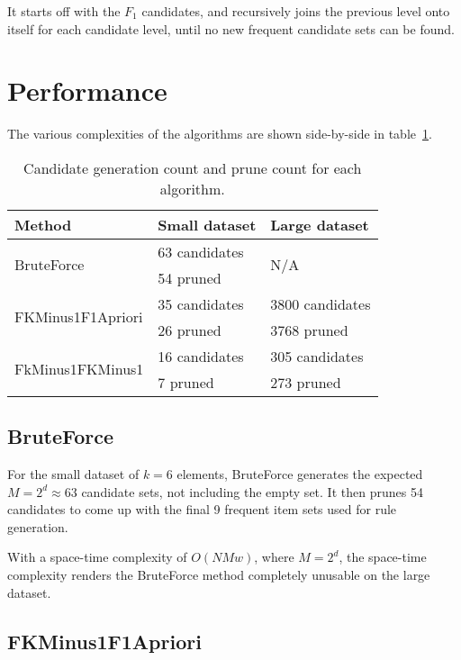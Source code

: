 \documentclass[11pt,a4paper]{article}
\begin{document}
It starts off with the $F_1$ candidates, and recursively joins the previous level onto itself for each candidate level, until no new frequent candidate sets can be found.

\section{Performance}

The various complexities of the algorithms are shown side-by-side in table~\ref{tbl:counts}.

\begin{table}
  \centering
  \begin{tabular}{|l|l|l|}
    \hline
    Method                             & Small dataset & Large dataset \\ \hline
    \multirow{2}{*}{BruteForce}        & 63 candidates & \multirow{2}{*}{N/A} \\
                                       & 54 pruned     & \\ \hline
    \multirow{2}{*}{FKMinus1F1Apriori} & 35 candidates & 3800 candidates \\
                                       & 26 pruned     & 3768 pruned \\ \hline
    \multirow{2}{*}{FkMinus1FKMinus1}  & 16 candidates & 305 candidates \\
                                       & 7 pruned      & 273 pruned \\ \hline
  \end{tabular}
  \caption{Candidate generation count and prune count for each algorithm.}
  \label{tbl:counts}
\end{table}

\subsection{BruteForce}

For the small dataset of $k = 6$ elements, BruteForce generates the expected $M = 2^d \approx 63$ candidate sets, not including the empty set. It then prunes 54 candidates to come up with the final 9 frequent item sets used for rule generation.

With a space-time complexity of $O(NMw)$, where $M = 2^d$, the space-time complexity renders the BruteForce method completely unusable on the large dataset.

\subsection{FKMinus1F1Apriori}
\end{document}
